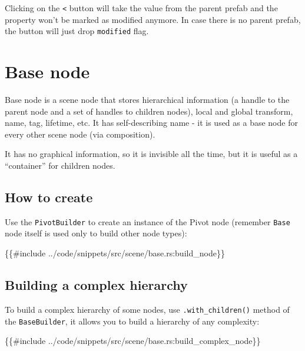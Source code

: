 \documentclass[
]{book}
\newenvironment{Shaded}{\begin{snugshade}}{\end{snugshade}}
\newcommand{\NormalTok}[1]{#1}
\theoremstyle{definition}
\theoremstyle{definition}
\theoremstyle{definition}
\theoremstyle{definition}
\theoremstyle{remark}
\begin{document}
Clicking on the \texttt{\textless{}} button will take the value from the parent prefab and the property won't be marked as modified anymore. In case there is no parent prefab, the button will just drop \texttt{modified} flag.

\section{Base node}\label{base-node}

Base node is a scene node that stores hierarchical information (a handle to the parent node and a set of handles to children nodes), local and global transform, name, tag, lifetime, etc. It has self-describing name - it is used as a base node for every other scene node (via composition).

It has no graphical information, so it is invisible all the time, but it is useful as a ``container'' for children nodes.

\subsection{How to create}\label{how-to-create-2}

Use the \texttt{PivotBuilder} to create an instance of the Pivot node (remember \texttt{Base} node itself is used only to build other node types):

\begin{Shaded}
\begin{Highlighting}[]
\NormalTok{\{\{\#include ../code/snippets/src/scene/base.rs:build\_node\}\}}
\end{Highlighting}
\end{Shaded}

\subsection{Building a complex hierarchy}\label{building-a-complex-hierarchy}

To build a complex hierarchy of some nodes, use \texttt{.with\_children()} method of the \texttt{BaseBuilder}, it allows you to build a hierarchy of any complexity:

\begin{Shaded}
\begin{Highlighting}[]
\NormalTok{\{\{\#include ../code/snippets/src/scene/base.rs:build\_complex\_node\}\}}
\end{Highlighting}
\end{Shaded}
\end{document}
